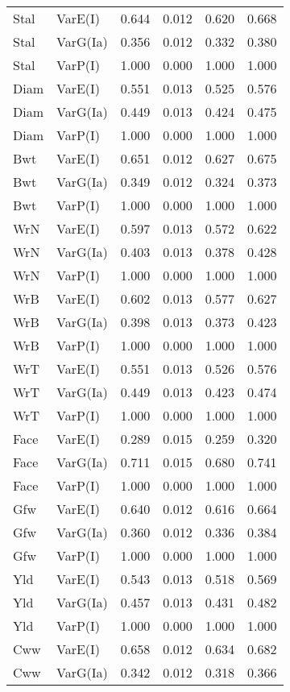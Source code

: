\begin{center}
\begin{longtable}{|p{0.6in}|p{0.7in}|p{0.6in}|p{0.6in}|p{0.6in}|p{0.6in}|}
Stal & VarE(I) & 0.644 & 0.012 & 0.620 & 0.668 \\ 
  Stal & VarG(Ia) & 0.356 & 0.012 & 0.332 & 0.380 \\ 
  Stal & VarP(I) & 1.000 & 0.000 & 1.000 & 1.000 \\ 
  Diam & VarE(I) & 0.551 & 0.013 & 0.525 & 0.576 \\ 
  Diam & VarG(Ia) & 0.449 & 0.013 & 0.424 & 0.475 \\ 
  Diam & VarP(I) & 1.000 & 0.000 & 1.000 & 1.000 \\ 
  Bwt & VarE(I) & 0.651 & 0.012 & 0.627 & 0.675 \\ 
  Bwt & VarG(Ia) & 0.349 & 0.012 & 0.324 & 0.373 \\ 
  Bwt & VarP(I) & 1.000 & 0.000 & 1.000 & 1.000 \\ 
  WrN & VarE(I) & 0.597 & 0.013 & 0.572 & 0.622 \\ 
  WrN & VarG(Ia) & 0.403 & 0.013 & 0.378 & 0.428 \\ 
  WrN & VarP(I) & 1.000 & 0.000 & 1.000 & 1.000 \\ 
  WrB & VarE(I) & 0.602 & 0.013 & 0.577 & 0.627 \\ 
  WrB & VarG(Ia) & 0.398 & 0.013 & 0.373 & 0.423 \\ 
  WrB & VarP(I) & 1.000 & 0.000 & 1.000 & 1.000 \\ 
  WrT & VarE(I) & 0.551 & 0.013 & 0.526 & 0.576 \\ 
  WrT & VarG(Ia) & 0.449 & 0.013 & 0.423 & 0.474 \\ 
  WrT & VarP(I) & 1.000 & 0.000 & 1.000 & 1.000 \\ 
  Face & VarE(I) & 0.289 & 0.015 & 0.259 & 0.320 \\ 
  Face & VarG(Ia) & 0.711 & 0.015 & 0.680 & 0.741 \\ 
  Face & VarP(I) & 1.000 & 0.000 & 1.000 & 1.000 \\ 
  Gfw & VarE(I) & 0.640 & 0.012 & 0.616 & 0.664 \\ 
  Gfw & VarG(Ia) & 0.360 & 0.012 & 0.336 & 0.384 \\ 
  Gfw & VarP(I) & 1.000 & 0.000 & 1.000 & 1.000 \\ 
  Yld & VarE(I) & 0.543 & 0.013 & 0.518 & 0.569 \\ 
  Yld & VarG(Ia) & 0.457 & 0.013 & 0.431 & 0.482 \\ 
  Yld & VarP(I) & 1.000 & 0.000 & 1.000 & 1.000 \\ 
  Cww & VarE(I) & 0.658 & 0.012 & 0.634 & 0.682 \\ 
  Cww & VarG(Ia) & 0.342 & 0.012 & 0.318 & 0.366 \\ 

\end{longtable}
\end{center}
